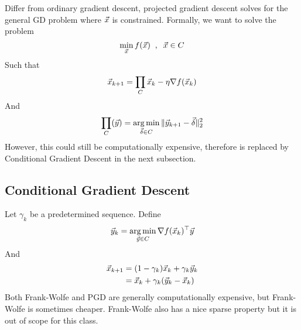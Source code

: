 \begin{definition}
	Differ from ordinary gradient descent, projected gradient descent solves for the general GD problem where $\vec{x}$ is constrained. Formally, we want to solve the problem
	\[
\min_{\vec{x}}f(\vec{x})\;\;,\;\;\vec{x}\in C
	\]
	Such that
	\[
\vec{x}_{k+1} = \prod_C\vec{x}_k-\eta\nabla f(\vec{x}_k)
	\]
	And
	\[
\prod_C(\vec{y}) = \operatorname*{arg\,min}_{\vec{\delta}\in C}\|\vec{y}_{k+1}-\vec{\delta}\|_2^2
	\]
	However, this could still be computationally expensive, therefore is replaced by Conditional Gradient Descent in the next subsection.
\end{definition}


\subsection{Conditional Gradient Descent} %
\label{sub:conditional_gradient_descent}

\begin{definition}
	Let $\gamma_k$ be a predetermined sequence. Define
	\[
\vec{y}_k = \operatorname*{arg\,min}_{\vec{y}\in C}\nabla f(\vec{x}_k)^\top\vec{y}
	\]
	And
	\begin{align*}
		\vec{x}_{k+1} &= (1- \gamma_k)\vec{x}_k+ \gamma_k\vec{y}_k\\
		&= \vec{x}_k + \gamma_k(\vec{y}_k-\vec{x}_k)
	\end{align*}
	Both Frank-Wolfe and PGD are generally computationally expensive, but Frank-Wolfe is sometimes cheaper. Frank-Wolfe also has a nice sparse property but it is out of scope for this class.
\end{definition}


